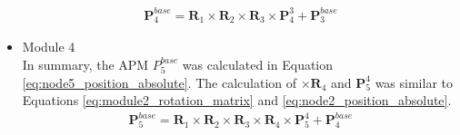 \begin{itemize}
    \vspace{-12mm}
    \begin{align}
        \textbf{P}_{4}^{base} = \textbf{R}_{1} \times\textbf{R}_{2} 
        \times\textbf{R}_{3} \times \textbf{P}_{4}^{3} + \textbf{P}_{3}^{base}
        \label{eq:node4_position_absolute}
    \end{align}
    \vspace{-15mm}
    \item Module 4 \\
    In summary, the APM $P_5^{base}$ was calculated in 
    Equation \ref{eq:node5_position_absolute}. The calculation of $\times\textbf{R}_{4}$ and $\textbf{P}_{5}^{4}$ 
    was similar to Equations \ref{eq:module2_rotation_matrix} and \ref{eq:node2_position_absolute}.
    \vspace{-5mm}
    \begin{align}
        \textbf{P}_{5}^{base} = \textbf{R}_{1} \times\textbf{R}_{2} \times\textbf{R}_{3} \times\textbf{R}_{4} 
        \times \textbf{P}_{5}^{4} + \textbf{P}_{4}^{base}
        \label{eq:node5_position_absolute}
    \end{align}
    \vspace{-15mm}
\end{itemize}

